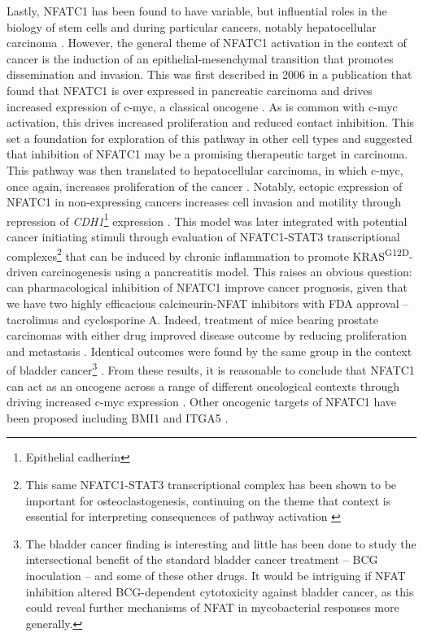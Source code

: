 Lastly, NFATC1 has been found to have variable, but influential roles in the biology of stem cells and during particular cancers, notably hepatocellular carcinoma \citep{Daniel2014}. However, the general theme of NFATC1 activation in the context of cancer is the induction of an epithelial\hyp{}mesenchymal transition that promotes dissemination and invasion. This was first described in 2006 in a publication that found that NFATC1 is over expressed in pancreatic carcinoma and drives increased expression of c\hyp{}myc, a classical oncogene \citep{Buchholz2006, Eerola2019}. As is common with c\hyp{}myc activation, this drives increased proliferation and reduced contact inhibition. This set a foundation for exploration of this pathway in other cell types and suggested that inhibition of NFATC1 may be a promising therapeutic target in carcinoma. This pathway was then translated to hepatocellular carcinoma, in which c\hyp{}myc, once again, increases proliferation of the cancer \citep{Wang2012}. Notably, ectopic expression of NFATC1 in non\hyp{}expressing cancers increases cell invasion and motility through repression of \textit{CDH1}\footnote{Epithelial cadherin} expression \citep{Oikawa2013}. This model was later integrated with potential cancer initiating stimuli through evaluation of NFATC1\hyp{}STAT3 transcriptional complexes\footnote{This same NFATC1\hyp{}STAT3 transcriptional complex has been shown to be important for osteoclastogenesis, continuing on the theme that context is essential for interpreting consequences of pathway activation \citep{Baumgart2014}} that can be induced by chronic inflammation to promote KRAS\textsuperscript{G12D}\hyp{}driven carcinogenesis using a pancreatitis model. This raises an obvious question: can pharmacological inhibition of NFATC1 improve cancer prognosis, given that we have two highly efficacious calcineurin\hyp{}NFAT inhibitors with FDA approval -- tacrolimus and cyclosporine A. Indeed, treatment of mice bearing prostate carcinomas with either drug improved disease outcome by reducing proliferation and metastasis \citep{Kawahara2015a}. Identical outcomes were found by the same group in the context of bladder cancer\footnote{The bladder cancer finding is interesting and little has been done to study the intersectional benefit of the standard bladder cancer treatment -- BCG inoculation -- and some of these other drugs. It would be intriguing if NFAT inhibition altered BCG\hyp{}dependent cytotoxicity against bladder cancer, as this could reveal further mechanisms of NFAT in mycobacterial responses more generally.} \citep{Kawahara2015b}. From these results, it is reasonable to conclude that NFATC1 can act as an oncogene across a range of different oncological contexts through driving increased c\hyp{}myc expression \citep{Buchholz2006, Flockhart2009, Seifert2009, Oikawa2013, Kawahara2015a, Kawahara2015b, Liu2021b}. Other oncogenic targets of NFATC1 have been proposed including BMI1 \citep{Wu2019} and ITGA5 \citep{Eerola2019}. 

